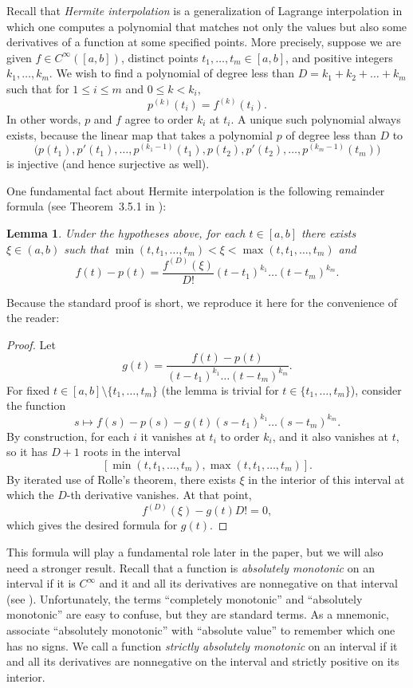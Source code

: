 \documentclass{jams-l}
\theoremstyle{plain}
\newtheorem{lemma}[theorem]{Lemma}
\numberwithin{theorem}{section}
\theoremstyle{definition}
\numberwithin{equation}{section}
\begin{document}
Recall that \textit{Hermite interpolation\/} is a generalization
of Lagrange interpolation in which one computes a polynomial that
matches not only the values but also some derivatives of a
function at some specified points.  More precisely, suppose we are
given $f \in C^\infty([a,b])$, distinct points $t_1,\dots,t_m \in
[a,b]$, and positive integers $k_1,\dots,k_m$.  We wish to find a
polynomial of degree less than $D=k_1+k_2+\dots+k_m$ such that for
$1 \le i \le m$ and $0 \le k < k_i$,
$$
p^{(k)}(t_i) = f^{(k)}(t_i).
$$
In other words, $p$ and $f$ agree to order $k_i$ at $t_i$. A
unique such polynomial always exists, because the linear map that
takes a polynomial $p$ of degree less than $D$ to
$$
\big(p(t_1),p'(t_1),\dots,p^{(k_1-1)}(t_1),p(t_2),p'(t_2),
\dots,p^{(k_m-1)}(t_m)\big)
$$
is injective (and hence surjective as well).

One fundamental fact about Hermite interpolation is the following
remainder formula (see Theorem~3.5.1 in \cite[p.~68]{D}):

\begin{lemma}\label{lemma:remainder}
Under the hypotheses above, for each $t \in [a,b]$ there exists
$\xi \in (a,b)$ such that $\min(t,t_1,\dots,t_m) < \xi <
\max(t,t_1,\dots,t_m)$ and
$$
f(t) - p(t) = \frac{f^{(D)}(\xi)}{D!}(t-t_1)^{k_1}\dots
(t-t_m)^{k_m}.
$$
\end{lemma}

Because the standard proof is short, we reproduce it here for the
convenience of the reader:

\begin{proof}
Let
$$
g(t) = \frac{f(t) - p(t)}{(t-t_1)^{k_1}\dots (t-t_m)^{k_m}}.
$$
For fixed $t \in [a,b] \setminus \{t_1,\dots,t_m\}$ (the lemma is
trivial for $t \in \{t_1,\dots,t_m\}$), consider the function
$$
s \mapsto f(s) - p(s) - g(t)(s-t_1)^{k_1}\dots (s-t_m)^{k_m}.
$$
By construction, for each $i$ it vanishes at $t_i$ to order $k_i$,
and it also vanishes at $t$, so it has $D+1$ roots in the interval
$$
[\min(t,t_1,\dots,t_m),\max(t,t_1,\dots,t_m)].
$$
By iterated use of Rolle's theorem, there exists $\xi$ in the
interior of this interval at which the $D$-th derivative vanishes.
At that point,
$$
f^{(D)}(\xi) - g(t) D! = 0,
$$
which gives the desired formula for $g(t)$.
\end{proof}

This formula will play a fundamental role later in the paper, but
we will also need a stronger result.  Recall that a function is
\textit{absolutely monotonic\/} on an interval if it is $C^\infty$
and it and all its derivatives are nonnegative on that interval
(see \cite[p.~144]{W}). Unfortunately, the terms ``completely
monotonic'' and ``absolutely monotonic'' are easy to confuse, but
they are standard terms.  As a mnemonic, associate ``absolutely
monotonic'' with ``absolute value'' to remember which one has no
signs.  We call a function \textit{strictly absolutely
monotonic\/} on an interval if it and all its derivatives are
nonnegative on the interval and strictly positive on its interior.
\end{document}
